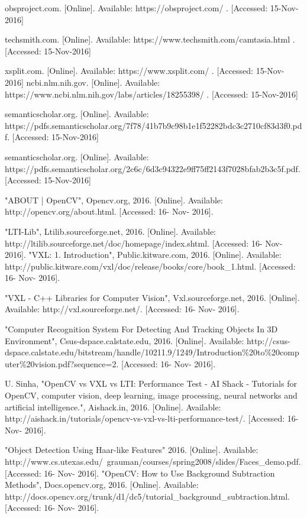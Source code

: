 \documentclass[letterpaper,10pt,onecolumn,draftclsnofoot]{IEEEtran}
\begin{document}
\begin{thebibliography}{99}
obsproject.com. [Online]. Available: https://obsproject.com/ . [Accessed: 15-Nov-2016] 

techsmith.com. [Online]. Available: https://www.techsmith.com/camtasia.html . [Accessed: 15-Nov-2016]

xsplit.com. [Online]. Available: https://www.xsplit.com/ . [Accessed: 15-Nov-2016]
 ncbi.nlm.nih.gov. [Online]. Available: https://www.ncbi.nlm.nih.gov/labs/articles/18255398/ . [Accessed: 15-Nov-2016]

semanticscholar.org. [Online]. Available: https://pdfs.semanticscholar.org/7f78/41b7b9c98b1e1f52282bdc3c2710cf83d3f0.pdf. [Accessed: 15-Nov-2016]

 semanticscholar.org. [Online]. Available: https://pdfs.semanticscholar.org/2c6c/6d3c94322e9ff75ff2143f7028bfab2b3c5f.pdf. [Accessed: 15-Nov-2016]

"ABOUT | OpenCV", Opencv.org, 2016. [Online]. Available: http://opencv.org/about.html. [Accessed: 16- Nov- 2016].

"LTI-Lib", Ltilib.sourceforge.net, 2016. [Online]. Available: http://ltilib.sourceforge.net/doc/homepage/index.shtml. [Accessed: 16- Nov- 2016].
"VXL: 1. Introduction", Public.kitware.com, 2016. [Online]. Available: http://public.kitware.com/vxl/doc/release/books/core/book\_1.html. [Accessed: 16- Nov- 2016].

"VXL - C++ Libraries for Computer Vision", Vxl.sourceforge.net, 2016. [Online]. Available: http://vxl.sourceforge.net/. [Accessed: 16- Nov- 2016].

"Computer Recognition System For Detecting And Tracking Objects In 3D Environment", Csus-dspace.calstate.edu, 2016. [Online]. Available: http://csus-dspace.calstate.edu/bitstream/handle/10211.9/1249/Introduction\%20to\%20computer\%20vision.pdf?sequence=2. [Accessed: 16- Nov- 2016].

U. Sinha, "OpenCV vs VXL vs LTI: Performance Test - AI Shack - Tutorials for OpenCV, computer vision, deep learning, image processing, neural networks and artificial intelligence.", Aishack.in, 2016. [Online]. Available: http://aishack.in/tutorials/opencv-vs-vxl-vs-lti-performance-test/. [Accessed: 16- Nov- 2016].

"Object Detection Using Haar-like Features" 2016. [Online]. Available: http://www.cs.utexas.edu/~grauman/courses/spring2008/slides/Faces\_demo.pdf. [Accessed: 16- Nov- 2016].
"OpenCV: How to Use Background Subtraction Methods", Docs.opencv.org, 2016. [Online]. Available: http://docs.opencv.org/trunk/d1/dc5/tutorial\_background\_subtraction.html. [Accessed: 16- Nov- 2016].


\end{thebibliography}
\end{document}
